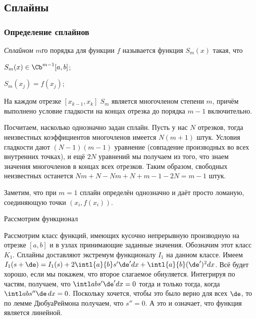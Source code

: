\documentclass[a4paper]{article}
\newcommand{\dx}{\,dx}
\begin{document}
\subsection{Сплайны}

\subsubsection{Определение сплайнов}

\begin{df}
\emph{Сплайном} $m$\д го порядка для функции $f$ называется функция $S_m(x)$ такая, что
\begin{points}{-3}
\item $S_m(x) \in \Cb^{m-1}[a,b]$;
\item $S_m(x_j) = f(x_j)$;
\item На каждом отрезке $[x_{k-1},x_k]$ $S_m$ является многочленом степени $m$, причём выполнено условие гладкости
на концах отрезка до порядка $m-1$ включительно.
\end{points}
\end{df}

Посчитаем, насколько однозначно задан сплайн. Пусть у нас $N$ отрезков, тогда неизвестных коэффициентов многочленов
имеется $N(m+1)$ штук. Условия гладкости дают $(N-1)(m-1)$ уравнение (совпадение производных во всех внутренних
точках), и ещё $2N$ уравнений мы получаем из того, что знаем значения многочленов в концах всех отрезков.
Таким образом, свободных неизвестных останется $Nm + N - Nm + N + m - 1 - 2N  = m-1$ штук.

Заметим, что при $m=1$ сплайн определён однозначно и даёт просто ломаную, соединяющую точки $(x_i, f(x_i))$.

Рассмотрим функционал

Рассмотрим класс функций, имеющих кусочно непрерывную производную на отрезке $[a,b]$
и в узлах принимающие заданные значения. Обозначим этот класс $K_1$.
Сплайны доставляют экстремум функционалу $I_1$ на данном классе.
Имеем $I_1(s + \de) = I_1(s) + 2\intl{a}{b} s'\de' dx + \intl{a}{b} (\de')^2dx$.
Всё будет хорошо, если мы покажем, что второе слагаемое обнуляется. Интегрируя по частям, получаем,
что $\intl ab s'\de'dx = 0 $ тогда и только тогда, когда $\intl ab s'' \de\dx = 0$.
Поскольку хочется, чтобы это было верно для всех $\de$, то по лемме Дюбуа\ч Реймона получаем, что $s'' = 0$.
А это и означает, что функция является линейной.
\end{document}
